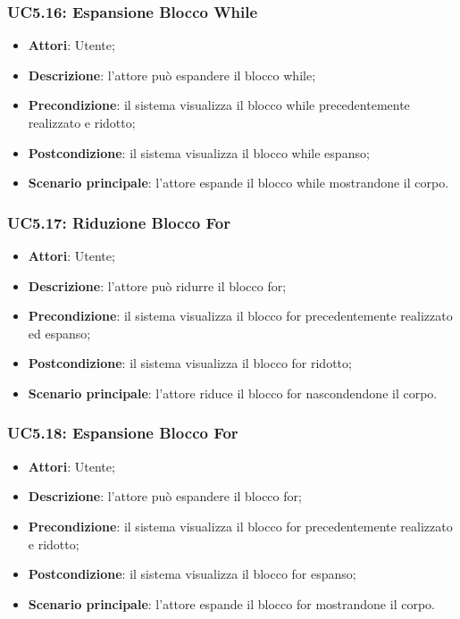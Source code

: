 \subsubsection{UC5.16: Espansione Blocco While}
\label{UC5.16}
\begin{itemize}
	\item \textbf{Attori}: Utente;
	\item \textbf{Descrizione}: l'attore può espandere il blocco while;
	\item \textbf{Precondizione}: il sistema visualizza il blocco while precedentemente realizzato e ridotto;
	\item \textbf{Postcondizione}: il sistema visualizza il blocco while espanso;
	\item \textbf{Scenario principale}: l'attore espande il blocco while mostrandone il corpo.
\end{itemize}

\subsubsection{UC5.17: Riduzione Blocco For}
\label{UC5.17}
\begin{itemize}
	\item \textbf{Attori}: Utente;
	\item \textbf{Descrizione}: l'attore può ridurre il blocco for;
	\item \textbf{Precondizione}: il sistema visualizza il blocco for precedentemente realizzato ed espanso;
	\item \textbf{Postcondizione}: il sistema visualizza il blocco for ridotto;
	\item \textbf{Scenario principale}: l'attore riduce il blocco for nascondendone il corpo.
\end{itemize}

\subsubsection{UC5.18: Espansione Blocco For}
\label{UC5.18}
\begin{itemize}
	\item \textbf{Attori}: Utente;
	\item \textbf{Descrizione}: l'attore può espandere il blocco for;
	\item \textbf{Precondizione}: il sistema visualizza il blocco for precedentemente realizzato e ridotto;
	\item \textbf{Postcondizione}: il sistema visualizza il blocco for espanso;
	\item \textbf{Scenario principale}: l'attore espande il blocco for mostrandone il corpo.
\end{itemize}

